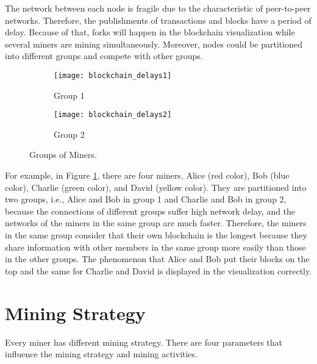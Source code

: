 The network between each node is fragile due to the characteristic of peer-to-peer networks. Therefore, the publishments of transactions and blocks have a period of delay. Because of that, forks will happen in the blockchain visualization while several miners are mining simultaneously. Moreover, nodes could be partitioned into different groups and compete with other groups.

\begin{figure}[htb]
    \centering
    \begin{subfigure}[b]{1\textwidth}
        \centering
        \texttt{[image: blockchain\_delays1]}
        \caption{Group 1}
    \end{subfigure}
    
    \begin{subfigure}[b]{1\textwidth}
        \centering
        \texttt{[image: blockchain\_delays2]}
        \caption{Group 2}
    \end{subfigure}

    \caption{Groups of Miners.}
    \label{fig:groups of miners}
\end{figure}

For example, in Figure \ref{fig:groups of miners}, there are four miners, Alice (red color), Bob (blue color), Charlie (green color), and David (yellow color). They are partitioned into two groups, i.e., Alice and Bob in group 1 and Charlie and Bob in group 2, because the connections of different groups suffer high network delay, and the networks of the miners in the same group are much faster. Therefore, the miners in the same group consider that their own blockchain is the longest because they share information with other members in the same group more easily than those in the other groups. The phenomenon that Alice and Bob put their blocks on the top and the same for Charlie and David is displayed in the visualization correctly.

\clearpage

\section{Mining Strategy}

Every miner has different mining strategy. There are four parameters that influence the mining strategy and mining activities. 

